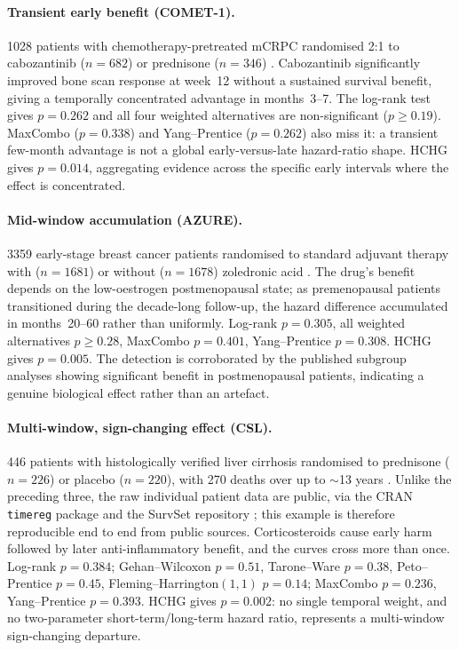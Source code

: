 \documentclass[11pt]{article}
\begin{document}
\paragraph{Transient early benefit (COMET-1).}
1028 patients with chemotherapy-pretreated mCRPC randomised 2:1 to
cabozantinib ($n=682$) or prednisone ($n=346$) \citep{smith2016}.
Cabozantinib significantly improved bone scan response at week~12 without a
sustained survival benefit, giving a temporally concentrated advantage in
months~3--7. The log-rank test gives $p = 0.262$ and all four weighted
alternatives are non-significant ($p \geq 0.19$). MaxCombo ($p = 0.338$) and
Yang--Prentice ($p = 0.262$) also miss it: a transient few-month advantage
is not a global early-versus-late hazard-ratio shape. HCHG gives
$p = 0.014$, aggregating evidence across the specific early intervals where
the effect is concentrated.

\paragraph{Mid-window accumulation (AZURE).}
3359 early-stage breast cancer patients randomised to standard adjuvant
therapy with ($n=1681$) or without ($n=1678$) zoledronic acid
\citep{coleman2011,coleman2014}. The drug's benefit depends on the
low-oestrogen postmenopausal state; as premenopausal patients transitioned
during the decade-long follow-up, the hazard difference accumulated in
months~20--60 rather than uniformly. Log-rank $p = 0.305$, all weighted
alternatives $p \geq 0.28$, MaxCombo $p = 0.401$, Yang--Prentice
$p = 0.308$. HCHG gives $p = 0.005$. The detection is corroborated by the
published subgroup analyses showing significant benefit in postmenopausal
patients, indicating a genuine biological effect rather than an artefact.

\paragraph{Multi-window, sign-changing effect (CSL).}
446 patients with histologically verified liver cirrhosis randomised to
prednisone ($n=226$) or placebo ($n=220$), with 270 deaths over up to
$\sim$13 years \citep{csl_data}. Unlike the preceding three, the raw
individual patient data are public, via the CRAN \texttt{timereg} package
and the SurvSet repository \citep{survset2022}; this example is therefore
reproducible end to end from public sources. Corticosteroids cause early harm
followed by later anti-inflammatory benefit, and the curves cross more than
once. Log-rank $p = 0.384$; Gehan--Wilcoxon $p = 0.51$, Tarone--Ware
$p = 0.38$, Peto--Prentice $p = 0.45$, Fleming--Harrington$(1,1)$
$p = 0.14$; MaxCombo $p = 0.236$, Yang--Prentice $p = 0.393$. HCHG gives
$p = 0.002$: no single temporal weight, and no two-parameter
short-term/long-term hazard ratio, represents a multi-window sign-changing
departure.
\end{document}

